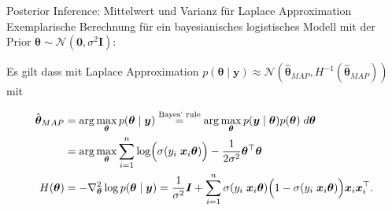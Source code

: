 \documentclass[
  ignorenonframetext,
  aspectratio=169,
]{beamer}
\newif\ifbibliography
\newcommand{\bnull}{\bm{0}}
\newcommand{\bx}{\bm{x}}
\newcommand{\by}{\bm{y}}
\newcommand{\bI}{\bm{I}}
\newcommand{\Ncal}{\mathcal{N}}
\newcommand{\ssd}{\sigma^2}
\newcommand{\btheta}{\bm{\theta}}
\newcommand{\hbtheta}{\hat{\bm{\theta}}}
\newcommand{\sumin}{\sum_{i = 1}^n}
\begin{document}
\begin{frame}{Posterior Inference: Mittelwert und Varianz für Laplace
Approximation}
\protect{}\label{posterior-inference-mittelwert-und-varianz-fuxfcr-laplace-approximation}
Exemplarische Berechnung für ein bayesianisches logistisches Modell mit
der Prior \(\btheta \sim \Ncal(\bnull, \ssd \bI)\):

Es gilt dass mit Laplace Approximation
\(p(\btheta \mid \by) \approx \Ncal(\hbtheta_{MAP}, H^{-1}(\hbtheta_{MAP}))\)
mit

\[
\begin{aligned}
    \hbtheta_{MAP} &= \arg \max_{\btheta} p(\btheta \mid \by)
        \overset{\text{Bayes' rule}}{=} \arg \max_{\btheta} p(\by \mid \btheta) p(\btheta) \; d\btheta  \\
        &= \arg \max_{\btheta} \sumin \log \Bigl( \sigma(y_i \; \bx_i\btheta)\Bigr) - \frac{1}{2 \ssd} \btheta^\top \btheta \\
    H(\btheta) &= - \nabla^2_{\btheta}  \log p (\btheta \mid \by) = \frac{1}{\ssd} \bI + \sumin
    \sigma(y_i \; \bx_i\btheta) \Bigl(1 - \sigma(y_i \; \bx_i\btheta)\Bigr)
        \bx_i \bx_i^\top.
\end{aligned}
\]
\end{frame}

\begin{frame}[allowframebreaks]{}
  \bibliographytrue
  \printbibliography[heading=none]
\end{frame}
\end{document}
